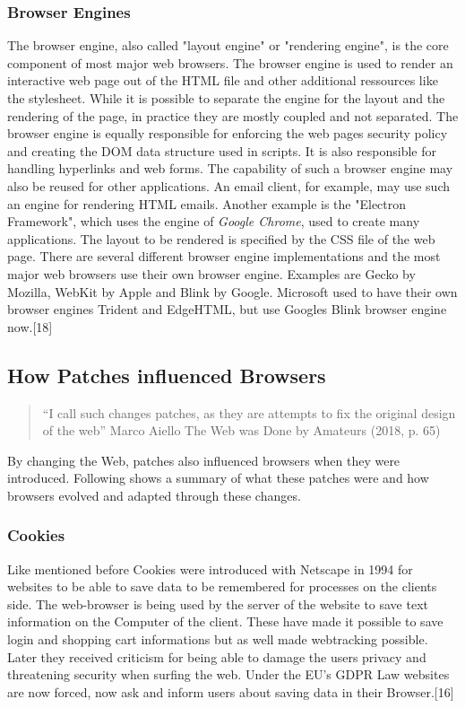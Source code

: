 \documentclass[runningheads]{llncs}
\begin{document}
		\subsubsection{Browser Engines}
		\leavevmode\newline
		The browser engine, also called "layout engine" or "rendering engine", is the core component of most major web browsers. 	The browser engine is used to render an interactive web page out of the HTML file and other additional ressources like the stylesheet. While it is possible to separate the engine for the layout and the rendering of the page, in practice they are mostly coupled and not separated. The browser engine is equally responsible for enforcing the web pages security policy and creating the DOM data structure used in scripts. It is also responsible for handling hyperlinks and web forms.
		The capability of such a browser engine may also be reused for other applications. An email client, for example, may use such an engine for rendering HTML emails. Another example is the "Electron Framework", which uses the engine of \textit{Google Chrome}, used to create many applications. The layout to be rendered is specified by the CSS file of the web page. There are several different browser engine implementations and the most major web browsers use their own browser engine. Examples are Gecko by Mozilla, WebKit by Apple and Blink by Google. Microsoft used to have their own browser engines Trident and EdgeHTML, but use Googles Blink browser engine now.[18]

		\subsection{How Patches influenced Browsers}
			\begin{quote}``I call such changes patches, as they are attempts to fix the original design of the web'' Marco Aiello The Web was Done by Amateurs (2018, p. 65)\end{quote}
		By changing the Web, patches also influenced browsers when they were introduced. Following shows a summary of what these patches were and how browsers evolved and adapted through these changes.
			\subsubsection{Cookies}
			\leavevmode\newline
			Like mentioned before Cookies were introduced with Netscape in 1994 for websites to be able to save data to be remembered for processes on the clients side. The web-browser is being used by the server of the website to save text information on the Computer of the client. These have made it possible to save login and shopping cart informations but as well made webtracking possible. Later they received criticism for being able to damage the users privacy and threatening security when surfing the web. Under the EU's GDPR Law websites are now forced, now ask and inform users about saving data in their Browser.[16]
\end{document}
